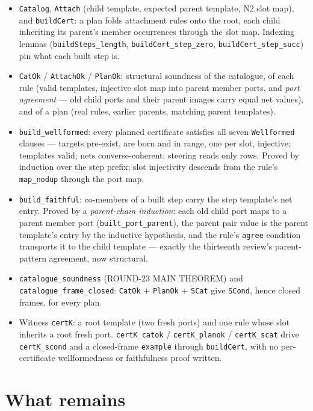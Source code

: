 \documentclass[11pt]{article}
\newcommand{\code}[1]{\texttt{#1}}
\begin{document}
\begin{itemize}[leftmargin=2em]
\item \code{Catalog}, \code{Attach} (child template, expected parent
template, N2 slot map), and \code{buildCert}: a plan folds attachment
rules onto the root, each child inheriting its parent's member
occurrences through the slot map.  Indexing lemmas
(\code{buildSteps\_length}, \code{buildCert\_step\_zero},
\code{buildCert\_step\_succ}) pin what each built step is.
\item \code{CatOk} / \code{AttachOk} / \code{PlanOk}: structural
soundness of the catalogue, of each rule (valid templates, injective
slot map into parent member ports, and \emph{port agreement} --- old
child ports and their parent images carry equal net values), and of a
plan (real rules, earlier parents, matching parent templates).
\item \code{build\_wellformed}: every planned certificate satisfies
all seven \code{Wellformed} clauses --- targets pre-exist, are born
and in range, one per slot, injective; templates valid; nets
converse-coherent; steering reads only rows.  Proved by induction over
the step prefix; slot injectivity descends from the rule's
\code{map\_nodup} through the port map.
\item \code{build\_faithful}: co-members of a built step carry the
step template's net entry.  Proved by a \emph{parent-chain
induction}: each old child port maps to a parent member port
(\code{built\_port\_parent}), the parent pair value is the parent
template's entry by the inductive hypothesis, and the rule's
\code{agree} condition transports it to the child template --- exactly
the thirteenth review's parent-pattern agreement, now structural.
\item \code{catalogue\_soundness} (ROUND-23 MAIN THEOREM) and
\code{catalogue\_frame\_closed}: \code{CatOk} + \code{PlanOk} +
\code{SCat} give \code{SCond}, hence closed frames, for every plan.
\item Witness \code{certK}: a root template (two fresh ports) and one
rule whose slot inherits a root fresh port.
\code{certK\_catok} / \code{certK\_planok} / \code{certK\_scat} drive
\code{certK\_scond} and a closed-frame \code{example} through
\code{buildCert}, with no per-certificate wellformedness or
faithfulness proof written.
\end{itemize}

\section{What remains}
\end{document}
